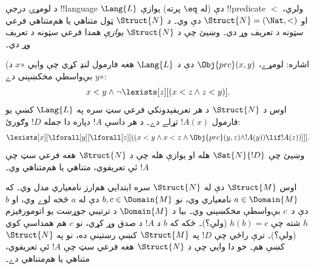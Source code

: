 \documentclass[../../../include/open-logic-section]{subfiles}
\begin{document}
\begin{prob}
د لومړۍ درجې !!{language} $\Lang{L}$ دې (له $\eq$ پرته) يوازې !!{predicate} $<$ ولري، او $\Struct{N} = (\Nat,
<)$ دې وي۔ د $\Struct{N}$ ټول متناهي يا هم‌متناهي فرعي سټونه د تعريف وړ دي۔ وښيئ چې د $\Struct{N}$ \emph{يوازې} همدا فرعي سټونه د تعريف وړ دي۔

(اشاره: لومړے، $\Obj{prc}(x,y)$ دې د $\Lang{L}$ هغه فارمول لنډ کړي چې وايي «$x$ د $y$ بې‌واسطې مخکښېنی دے»:
\[
x<y \land \lnot \lexists[z][(x<z \land z < y)].
\]
اوس د $\Struct{N}$ د هر تعريفېدونکي فرعي سټ سره په $\Lang{L}$ کښې يو فارمول $!A(x)$ تړلے دے۔ د هر داسې $!A$ دپاره دا جمله $!D$ وګورئ:
\[
\lexists[x][\lforall[y][\lforall[z][((x<y \land x<z \land \Obj{prc}(y,z)
  \land !A(y)) \lif !A(z))]]].
\]
وښيئ چې $\Sat{N}{!D}$ هله او يوازې هله چې د $\Struct{N}$ هغه فرعي سټ چې $!A$ ئې تعريفوي، متناهي يا هم‌متناهي وي۔

اوس $\Struct{M}$ دې له $\Struct{N}$ سره ابتدايي هم‌ارز نامعياري مدل وي۔ که $a \in \Domain{M}$ نامعياري وي، نو $b, c \in \Domain{M}$ دې له $a$ څخه لوے وي، او $b$ دې د~$c$ بې‌واسطې مخکښېنی وي۔ بيا د $\Domain{M}$ د ترتيبي جوړښت يو اتومورفيزم $h$ شته چې $h(b)=c$ (ولې؟)۔ ځکه که $b$ د $!A$ د صدق وړ کړي، نو $c$ هم همداسې کوي (ولې؟)۔ ترې راځي چې $!D$ په $\Struct{M}$ کښې رښتينې ده، نو په $\Struct{N}$ کښې هم۔ خو دا وايي چې د $\Struct{N}$ هغه فرعي سټ چې $!A$ ئې تعريفوي، متناهي يا هم‌متناهي دے۔
\end{prob}
\end{document}
